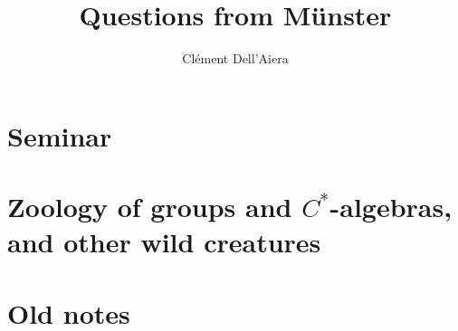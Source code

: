 \documentclass[a4paper,12pt]{book}
\title{\textbf{Questions from Münster}}
\date{}
\author{ Clément Dell'Aiera}
\begin{document}
\maketitle

\pagestyle{plain}
\tableofcontents

\pagestyle{fancy}
\chapter{Seminar}


\chapter{Zoology of groups and $C^*$-algebras, and other wild creatures}




\newpage
\chapter{Old notes}





%


 
\end{document}
